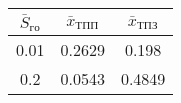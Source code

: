 \begin{tabular}{|c|c|c|}
\hline
$\bar{S}_{го}$ & $\bar{x}_{ТПП}$ & $\bar{x}_{ТПЗ}$ \\ 
\hline
0.01 & 0.2629 & 0.198 \\ 
\hline
0.2 & 0.0543 & 0.4849 \\ 
\hline
\end{tabular}